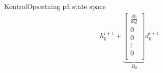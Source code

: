 \begin{frame}{Kontrol}{Opsætning på state space}
\begin{equation*}
\begin{aligned}
		h_0^{i+1}
		+ 
		\underbrace{\begin{bmatrix}
		 \frac{dh}{dQ}\\
		 0 \\
		 0\\
		 \vdots \\
		 0\\
		\end{bmatrix}}_{B_d}
		d_{0}^{i+1}
	\end{aligned}
\end{equation*}   
\vfill \vfill
\end{frame}

